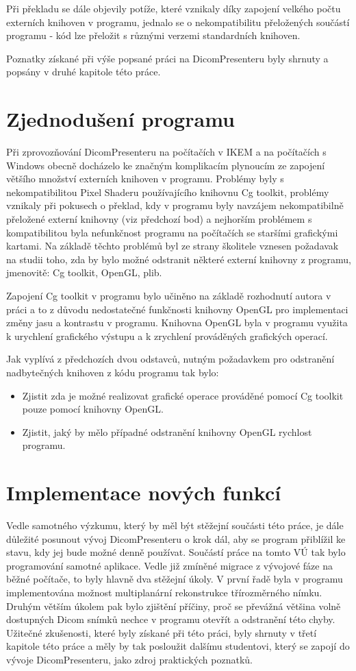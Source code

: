 Při překladu se dále objevily potíže, které vznikaly díky zapojení velkého počtu externích knihoven v programu, jednalo se o nekompatibilitu přeložených součástí programu - kód lze přeložit s různými verzemi standardních knihoven.

Poznatky získané při výše popsané práci na DicomPresenteru byly shrnuty a popsány v druhé kapitole této práce.

\section{Zjednodušení programu}
Při zprovozňování DicomPresenteru na počítačích v IKEM a na počítačích s Windows obecně docházelo ke značným komplikacím plynoucím ze zapojení většího množství externích knihoven v programu. Problémy byly s nekompatibilitou Pixel Shaderu používajícího knihovnu Cg toolkit, problémy vznikaly při pokusech o překlad, kdy v programu byly navzájem nekompatibilně přeložené externí knihovny (viz předchozí bod) a nejhorším problémem s kompatibilitou byla nefunkčnost programu na počítačích se staršími grafickými kartami. Na základě těchto problémů byl ze strany školitele vznesen požadavak na studii toho, zda by bylo možné odstranit některé externí knihovny z programu, jmenovitě: Cg toolkit, OpenGL, plib.

Zapojení Cg toolkit v programu bylo učiněno na základě rozhodnutí autora v práci \cite{neskudla} a to z důvodu nedostatečné funkčnosti knihovny OpenGL pro implementaci změny jasu a kontrastu v programu. Knihovna OpenGL byla v programu využita k urychlení grafického výstupu a k zrychlení prováděných grafických operací.

Jak vyplívá z předchozích dvou odstavců, nutným požadavkem pro odstranění nadbytečných knihoven z kódu programu tak bylo:

\begin{itemize}
\item Zjistit zda je možné realizovat grafické operace prováděné pomocí Cg toolkit pouze pomocí knihovny OpenGL.
\item Zjistit, jaký by mělo případné odstranění knihovny OpenGL rychlost programu.
\end{itemize}


\section{Implementace nových funkcí}
Vedle samotného výzkumu, který by měl být stěžejní součásti této práce, je dále důležité posunout vývoj DicomPresenteru o krok dál, aby se program přiblížil ke stavu, kdy jej bude možné denně používat. Součástí práce na tomto VÚ tak bylo programování samotné aplikace. Vedle již zmíněné migrace z vývojové fáze na běžné počítače, to byly hlavně dva stěžejní úkoly. V první řadě byla v programu implementována možnost multiplanární rekonstrukce třírozměrného nímku. Druhým větším úkolem pak bylo zjištění příčiny, proč se převážná většina volně dostupných Dicom snímků nechce v programu otevřít a odstranění této chyby. Užitečné zkušenosti, které byly získané při této práci, byly shrnuty v třetí kapitole této práce a měly by tak posloužit dalšímu studentovi, který se zapojí do vývoje DicomPresenteru, jako zdroj praktických poznatků.
